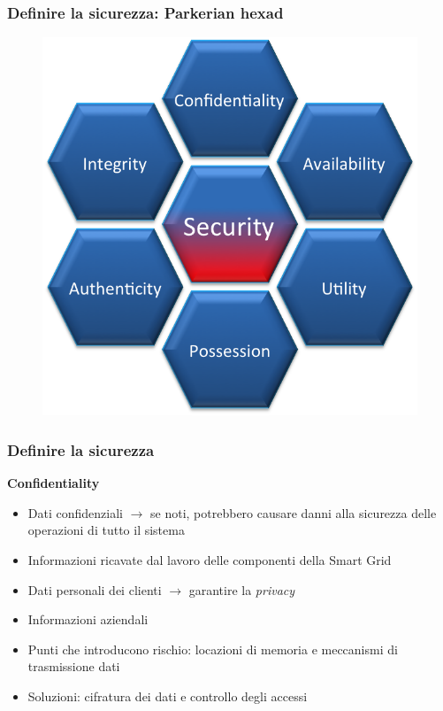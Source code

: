\begin{frame}
  \frametitle{Definire la sicurezza: Parkerian hexad}
  	\begin{figure}[h] 
		\includegraphics[scale=0.45]{imgs/hexad.png}
	\end{figure}
\end{frame}

\begin{frame}
  \frametitle{Definire la sicurezza}
  \textbf{Confidentiality}
  	\begin{itemize}[<+- | alert@+>]
  		\item Dati confidenziali $\rightarrow$ se noti, potrebbero causare danni alla sicurezza delle operazioni di tutto il sistema
  		\item Informazioni ricavate dal lavoro delle componenti della Smart Grid
  		\item Dati personali dei clienti $\rightarrow$ garantire la \textit{privacy}
  		\item Informazioni aziendali
  		\item Punti che introducono rischio: locazioni di memoria e meccanismi di trasmissione dati
  		\item Soluzioni: cifratura dei dati e controllo degli accessi
  	\end{itemize}
\end{frame}

